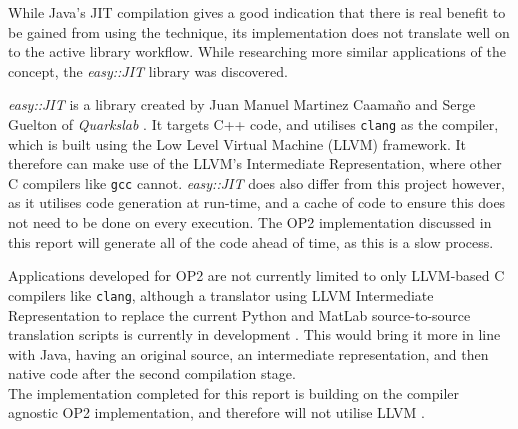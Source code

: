 While Java's JIT compilation gives a good indication that there is real benefit to be gained from using the technique, its implementation does not translate well on to the active library workflow. While researching more similar applications of the concept, the \textit{easy::JIT} library was discovered.\\
\par
{} \textit{easy::JIT} \cite{eJIT} is a library created by Juan Manuel Martinez Caamaño and Serge Guelton of \textit{Quarkslab} \cite{Quarkslab}. It targets C++ code, and utilises \verb|clang| \cite{clang} as the compiler, which is built using the Low Level Virtual Machine (LLVM) framework. It therefore can make use of the LLVM's Intermediate Representation, where other C compilers like \verb|gcc| cannot. \textit{easy::JIT} does also differ from this project however, as it utilises code generation at run-time, and a cache of code to ensure this does not need to be done on every execution. The OP2 implementation discussed in this report will generate all of the code ahead of time, as this is a slow process.
\par
Applications developed for OP2 are not currently limited to only LLVM-based C compilers like \verb|clang|, although a translator using LLVM Intermediate Representation to replace the current Python and MatLab source-to-source translation scripts is currently in development \cite{op2clang}. This would bring it more in line with Java, having an original source, an intermediate representation, and then native code after the second compilation stage.\\
The implementation completed for this report is building on the compiler agnostic OP2 implementation, and therefore will not utilise LLVM .
